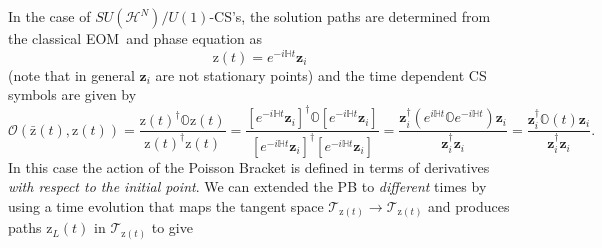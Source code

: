 \documentclass[aps,preprint]{revtex4}%
\begin{document}
In the case of $SU\left(  \mathcal{H}^{N}\right)  /U\left(  1\right)  $-CS's,
the solution paths are determined from the classical EOM\ and phase equation
as
\begin{equation}
\mathrm{z}\left(  t\right)  =e^{-i\mathbb{H}t}\mathbf{z}_{i}%
\end{equation}
(note that in general $\mathbf{z}_{i}$ are not stationary points) and the time
dependent CS symbols are given by
\begin{equation}
\mathcal{O}\left(  \mathrm{\bar{z}}\left(  t\right)  \mathrm{,z}\left(
t\right)  \right)  =\frac{\mathrm{z}\left(  t\right)  ^{\dagger}%
\mathbb{O}\mathrm{z}\left(  t\right)  }{\mathrm{z}\left(  t\right)  ^{\dagger
}\mathrm{z}\left(  t\right)  }=\frac{\left[  e^{-i\mathbb{H}t}\mathbf{z}%
_{i}\right]  ^{\dagger}\mathbb{O}\left[  e^{-i\mathbb{H}t}\mathbf{z}%
_{i}\right]  }{\left[  e^{-i\mathbb{H}t}\mathbf{z}_{i}\right]  ^{\dagger
}\left[  e^{-i\mathbb{H}t}\mathbf{z}_{i}\right]  }=\frac{\mathbf{z}%
_{i}^{\dagger}\left(  e^{i\mathbb{H}t}\mathbb{O}e^{-i\mathbb{H}t}\right)
\mathbf{z}_{i}}{\mathbf{z}_{i}^{\dagger}\mathbf{z}_{i}}=\frac{\mathbf{z}%
_{i}^{\dagger}\mathbb{O}\left(  t\right)  \mathbf{z}_{i}}{\mathbf{z}%
_{i}^{\dagger}\mathbf{z}_{i}}.
\end{equation}
In this case the action of the Poisson Bracket is defined in terms of
derivatives \emph{with respect to the initial point}.\emph{ }We can extended
the PB to \emph{different} times by using a time evolution that maps the
tangent space $\mathcal{T}_{\mathrm{z}\left(  t\right)  }\rightarrow
\mathcal{T}_{\mathrm{z}\left(  t\right)  }$ and produces paths $\mathrm{z}%
_{L}\left(  t\right)  $ in $\mathcal{T}_{\mathrm{z}\left(  t\right)  }$ to
give
\end{document}

